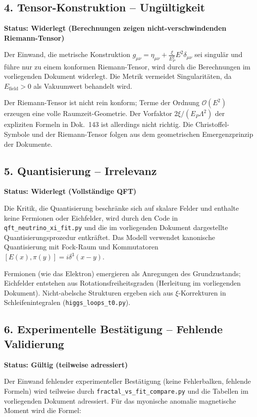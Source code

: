 \subsection{4. Tensor-Konstruktion – Ungültigkeit}
\textbf{Status: Widerlegt (Berechnungen zeigen nicht-verschwindenden Riemann-Tensor)}

Der Einwand, die metrische Konstruktion \(g_{\mu\nu} = \eta_{\mu\nu} + \frac{\xi}{E_P^2} E^2 \delta_{\mu\nu}\) sei singulär und führe nur zu einem konformen Riemann-Tensor, wird durch die Berechnungen im vorliegenden Dokument widerlegt. Die Metrik vermeidet Singularitäten, da \(E_{\text{field}} > 0\) als Vakuumwert behandelt wird.

Der Riemann-Tensor ist nicht rein konform; Terme der Ordnung \(\mathcal{O}(E^2)\) erzeugen eine volle Raumzeit-Geometrie. Der Vorfaktor $2\xi/(E_P\Lambda^2)$ der expliziten Formeln in Dok.~143 ist allerdings nicht richtig. Die Christoffel-Symbole und der Riemann-Tensor folgen aus dem geometrischen Emergenzprinzip der Dokumente.

\subsection{5. Quantisierung – Irrelevanz}
\textbf{Status: Widerlegt (Vollständige QFT)}

Die Kritik, die Quantisierung beschränke sich auf skalare Felder und enthalte keine Fermionen oder Eichfelder, wird durch den Code in \texttt{qft\_neutrino\_xi\_fit.py} und die im vorliegenden Dokument dargestellte Quantisierungsprozedur entkräftet. Das Modell verwendet kanonische Quantisierung mit Fock-Raum und Kommutatoren \([E(x), \pi(y)] = i\delta^3(x-y)\).

Fermionen (wie das Elektron) emergieren als Anregungen des Grundzustands; Eichfelder entstehen aus Rotationsfreiheitsgraden (Herleitung im vorliegenden Dokument). Nicht-abelsche Strukturen ergeben sich aus \(\xi\)-Korrekturen in Schleifenintegralen (\texttt{higgs\_loops\_t0.py}).

\subsection{6. Experimentelle Bestätigung – Fehlende Validierung}
\textbf{Status: Gültig (teilweise adressiert)}

Der Einwand fehlender experimenteller Bestätigung (keine Fehlerbalken, fehlende Formeln) wird teilweise durch \texttt{fractal\_vs\_fit\_compare.py} und die Tabellen im vorliegenden Dokument adressiert. Für das myonische anomalie magnetische Moment wird die Formel:

